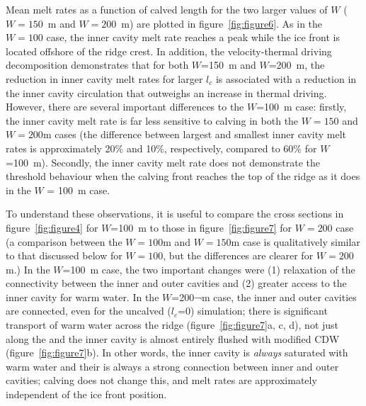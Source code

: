 \documentclass[draft]{agujournal2019}
\begin{document}
Mean melt rates as a function of calved length for the two larger values of $W$ ($W = 150$~m and $W = 200$~m) are plotted in figure~\ref{fig:figure6}. As in the $W = 100$ case, the inner cavity melt rate reaches a peak while the ice front is located offshore of the ridge crest. In addition, the velocity-thermal driving decomposition demonstrates that for both $W$=150~m and $W$=200~m, the reduction in inner cavity melt rates for larger $l_c$ is associated with a reduction in the inner cavity circulation that outweighs an increase in thermal driving. However, there are several important differences to the $W$=100~m case: firstly, the inner cavity melt rate is far less sensitive to calving in both the $W = 150$ and $W = 200$m cases (the difference between largest and smallest inner cavity melt rates is approximately 20\% and 10\%, respectively, compared to 60\% for $W$=100~m). Secondly, the inner cavity melt rate does not demonstrate the threshold behaviour when the calving front reaches the top of the ridge as it does in the $W$ = 100~m case.

To understand these observations, it is useful to compare the cross sections in figure~\ref{fig:figure4} for $W$=100~m to those in figure~\ref{fig:figure7} for $W = 200$ case (a comparison between the $W = 100$m and $W = 150$m case is qualitatively similar to that discussed below for $W = 100$, but the differences are clearer for $W = 200$m.) In the $W$=100~m case, the two important changes were (1) relaxation of the connectivity between the inner and outer cavities and (2) greater access to the inner cavity for warm water. In the $W$=200¬m case, the inner and outer cavities are connected, even for the uncalved ($l_c$=0) simulation; there is significant transport of warm water across the ridge (figure~\ref{fig:figure7}a, c, d), not just along the and the inner cavity is almost entirely flushed with modified CDW (figure~\ref{fig:figure7}b). In other words, the inner cavity is \textit{always} saturated with warm water and their is always a strong connection between inner and outer cavities; calving does not change this, and melt rates are approximately independent of the ice front position.


%
\end{document}
